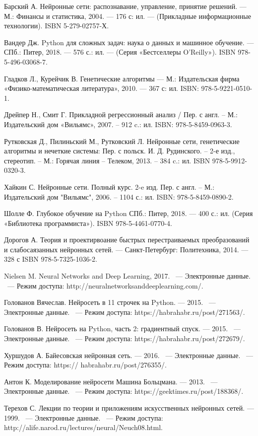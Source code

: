 \newpage

\begin{thebibliography}{99}

   Барский А. Нейронные сети: распознавание, управление, принятие решений. — М.: Финансы и статистика, 2004. — 176 с: ил. — (Прикладные информационные технологии). ISBN 5-279-02757-Х.

   Вандер Дж. Python для сложных задач: наука о данных и машинное обучение. — СПб.: Питер, 2018. — 576 с.: ил. — (Серия «Бестселлеры O’Reilly»). ISBN 978-5-496-03068-7. 

   Гладков Л., Курейчик В. Генетические алгоритмы — М.: Издательская фирма «Физико-математическая литература», 2010. — 367 с: ил. ISBN: 978-5-9221-0510-1.

  	Дрейпер Н., Смит Г. Прикладной регрессионный анализ / Пер. с англ. – М.: Издательский дом «Вильямс», 2007. – 912 c.: ил. ISBN: 978-5-8459-0963-3.

   Рутковская Д., Пилиньский М., Рутковский Л. Нейронные сети, генетические алгоритмы и нечеткие системы: Пер. с польск.  И. Д. Рудинского. – 2-е изд., стереотип. –  М.: Горячая линия – Телеком, 2013. – 384 c.: ил. ISBN 978-5-9912-0320-3.

   Хайкин С. Нейронные сети. Полный курс. 2-e изд. Пер. с англ. – М.: Издательский дом "Вильямс", 2006. – 1104 с.: ил. ISBN: 978-5-8459-0890-2.

   Шолле Ф. Глубокое обучение на Python 
  СПб.: Питер, 2018. — 400 с.: ил. (Серия «Библиотека программиста»). ISBN 978-5-4461-0770-4.

   Дорогов А. Теория и проектирвоание быстрых перестраиваемых преобразований и слабосаязанных нейронных сетей. — Санкт-Петербург: Политехника, 2014. — 328 с ISBN 978-5-7325-1036-2.

   Nielsen M. Neural Networks and Deep Learning, 2017. ~--- Электронные данные. ~--- Режим доступа:  http://neuralnetworksanddeeplearning.com/.

   Голованов Вячеслав. Нейросеть в 11 строчек на Python. — 2015. ~--- Электронные данные. ~--- Режим доступа: https://habrahabr.ru/post/271563/.

   Голованов В. Нейросеть на Python, часть 2: градиентный спуск. — 2015. ~--- Электронные данные. ~--- Режим доступа: https://habrahabr.ru/post/272679/.

   Хуршудов А. Байесовская нейронная сеть. — 2016. ~--- Электронные данные. ~--- Режим доступа: https://
  habrahabr.ru/post/276355/.

   Антон К. Моделирование нейросети Машина Больцмана. — 2013. ~--- Электронные данные. ~--- Режим доступа:
  https://geektimes.ru/post/188368/.

   Терехов С. Лекции по теории и приложениям искусственных
  нейронных сетей. — 1999. ~--- Электронные данные. ~--- Режим доступа: http://alife.narod.ru/lectures/neural/Neuch08.html.
  
  
\end{thebibliography}